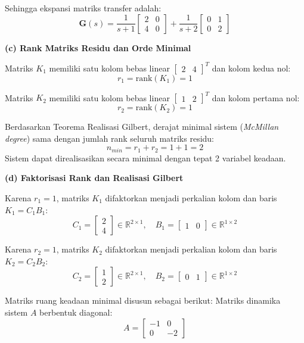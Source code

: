 \documentclass[11pt,a4paper]{article}
\begin{document}
Sehingga ekspansi matriks transfer adalah:
$$\mathbf{G}(s) = \frac{1}{s+1} \begin{bmatrix} 2 & 0 \\ 4 & 0 \end{bmatrix} + \frac{1}{s+2} \begin{bmatrix} 0 & 1 \\ 0 & 2 \end{bmatrix}$$

\textbf{(c) Rank Matriks Residu dan Orde Minimal}

Matriks $K_1$ memiliki satu kolom bebas linear $\begin{bmatrix} 2 & 4 \end{bmatrix}^T$ dan kolom kedua nol:
$$r_1 = \text{rank}(K_1) = 1$$

Matriks $K_2$ memiliki satu kolom bebas linear $\begin{bmatrix} 1 & 2 \end{bmatrix}^T$ dan kolom pertama nol:
$$r_2 = \text{rank}(K_2) = 1$$

Berdasarkan Teorema Realisasi Gilbert, derajat minimal sistem (\textit{McMillan degree}) sama dengan jumlah rank seluruh matriks residu:
$$n_{min} = r_1 + r_2 = 1 + 1 = 2$$
Sistem dapat direalisasikan secara minimal dengan tepat 2 variabel keadaan.

\textbf{(d) Faktorisasi Rank dan Realisasi Gilbert}

Karena $r_1 = 1$, matriks $K_1$ difaktorkan menjadi perkalian kolom dan baris $K_1 = C_1 B_1$:
$$C_1 = \begin{bmatrix} 2 \\ 4 \end{bmatrix} \in \mathbb{R}^{2 \times 1}, \quad B_1 = \begin{bmatrix} 1 & 0 \end{bmatrix} \in \mathbb{R}^{1 \times 2}$$

Karena $r_2 = 1$, matriks $K_2$ difaktorkan menjadi perkalian kolom dan baris $K_2 = C_2 B_2$:
$$C_2 = \begin{bmatrix} 1 \\ 2 \end{bmatrix} \in \mathbb{R}^{2 \times 1}, \quad B_2 = \begin{bmatrix} 0 & 1 \end{bmatrix} \in \mathbb{R}^{1 \times 2}$$

Matriks ruang keadaan minimal disusun sebagai berikut:
Matriks dinamika sistem $A$ berbentuk diagonal:
$$A = \begin{bmatrix} -1 & 0 \\ 0 & -2 \end{bmatrix}$$
\end{document}
